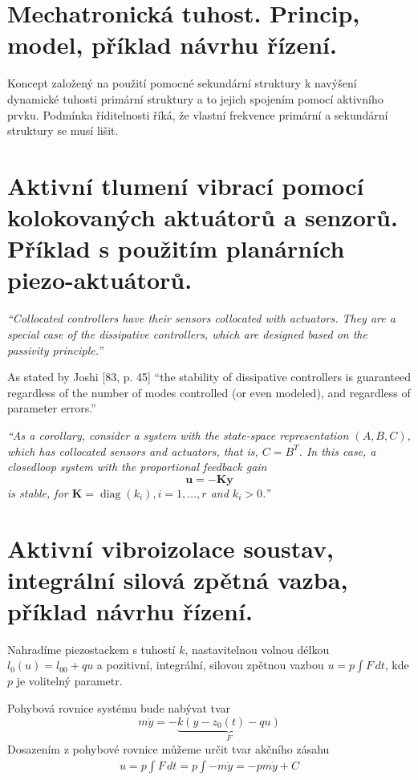\documentclass{article}
\begin{document}
	\section{Mechatronická tuhost. Princip, model, příklad návrhu řízení.}

	Koncept založený na použití pomocné sekundární struktury k navýšení dynamické tuhosti primární struktury a to jejich spojením pomocí aktivního prvku. Podmínka říditelnosti říká, že vlastní frekvence primární a sekundární struktury se musí lišit.

	\pagebreak
	\section{Aktivní tlumení vibrací pomocí kolokovaných aktuátorů a senzorů. Příklad s použitím planárních piezo-aktuátorů.}

	\emph{``Collocated controllers have their sensors collocated with actuators. They are a special case of the dissipative controllers, which are designed based on the passivity principle.''}

	As stated by Joshi [83, p. 45] “the stability of dissipative controllers is guaranteed regardless of the number of modes controlled (or even modeled), and regardless of parameter errors.”

	\emph{``As a corollary, consider a system with the state-space representation $(A, B, C)$, which has collocated sensors and actuators, that is, $C=B^{T}$. In this case, a closedloop system with the proportional feedback gain
	$$
	\bm{u}=-\bm{K}\bm{y}
	$$
	is stable, for $\bm{K}=\operatorname{diag}\left(k_i\right), i=1, \ldots, r$ and $k_i>0$.''}

	\pagebreak
	\section{Aktivní vibroizolace soustav, integrální silová zpětná vazba, příklad návrhu řízení.}

	Nahradíme piezostackem s tuhostí $k$, nastavitelnou volnou délkou $l_0(u) = l_{00} + qu$ a pozitivní, integrální, silovou zpětnou vazbou $u = p \int F\,dt$, kde $p$ je volitelný parametr.

	Pohybová rovnice systému bude nabývat tvar
	\begin{equation}
		m\ddot{y} = - \underbrace{k ( y-z_0(t)-qu)}_{F}
	\end{equation}
	Dosazením z pohybové rovnice můžeme určit tvar akčního zásahu
	\begin{align}
		u = p \int F\,dt = p \int -m\ddot{y} = -pm\dot{y} + C
	\end{align}
\end{document}
